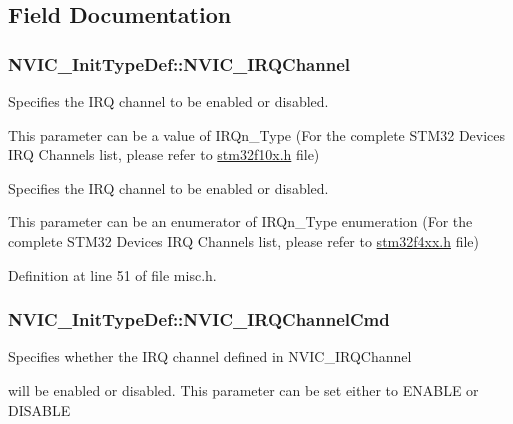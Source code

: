 \subsection{Field Documentation}
\hypertarget{struct_n_v_i_c___init_type_def_afa04cf6e559bb690bdd9fcb7e3d93dcf}{
\subsubsection[{N\-V\-I\-C\-\_\-\-I\-R\-Q\-Channel}]{ N\-V\-I\-C\-\_\-\-Init\-Type\-Def\-::\-N\-V\-I\-C\-\_\-\-I\-R\-Q\-Channel}}\label{struct_n_v_i_c___init_type_def_afa04cf6e559bb690bdd9fcb7e3d93dcf}
\begin{DoxyVerb}                    Specifies the IRQ channel to be enabled or disabled.
\end{DoxyVerb}
 This parameter can be a value of I\-R\-Qn\-\_\-\-Type (For the complete S\-T\-M32 Devices I\-R\-Q Channels list, please refer to \hyperlink{stm32f10x_8h}{stm32f10x.\-h} file)

\begin{DoxyVerb}                    Specifies the IRQ channel to be enabled or disabled.
\end{DoxyVerb}
 This parameter can be an enumerator of I\-R\-Qn\-\_\-\-Type enumeration (For the complete S\-T\-M32 Devices I\-R\-Q Channels list, please refer to \hyperlink{stm32f4xx_8h}{stm32f4xx.\-h} file) 

Definition at line 51 of file misc.\-h.

\hypertarget{struct_n_v_i_c___init_type_def_acb23fabb995fa4980c768825f12f5815}{
\subsubsection[{N\-V\-I\-C\-\_\-\-I\-R\-Q\-Channel\-Cmd}]{ N\-V\-I\-C\-\_\-\-Init\-Type\-Def\-::\-N\-V\-I\-C\-\_\-\-I\-R\-Q\-Channel\-Cmd}}\label{struct_n_v_i_c___init_type_def_acb23fabb995fa4980c768825f12f5815}
\begin{DoxyVerb}         Specifies whether the IRQ channel defined in NVIC_IRQChannel
\end{DoxyVerb}
 will be enabled or disabled. This parameter can be set either to E\-N\-A\-B\-L\-E or D\-I\-S\-A\-B\-L\-E 

